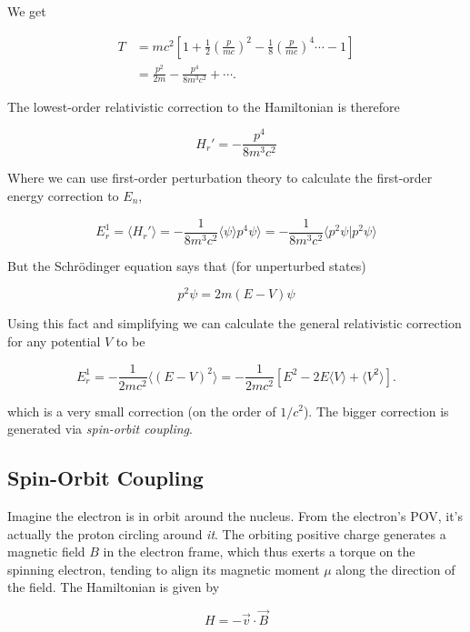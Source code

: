 \documentclass[svgnames]{article}
\begin{document}
We get 

\begin{align*}
    T &= mc^2\left[ 1 + \frac{1}{2}\left( \frac{p}{mc}  \right) ^2 - \frac{1}{8} \left( \frac{p}{mc} \right) ^4 \cdots - 1 \right]\\
      &= \frac{p^2}{2m} - \frac{p^4}{8m^3c^2} + \cdots.
\end{align*} \vspace{3px}


The lowest-order relativistic correction to the Hamiltonian is therefore 

\[
H_r' = -\frac{p^4}{8m^3 c^2}
\] \vspace{3px}

Where we can use first-order perturbation theory to calculate the first-order energy correction to $E_n$, 

\[
E_r^{1} = \langle H_r' \rangle = -\frac{1}{8m^3c^2}\langle \psi \rangle p^4 \psi \rangle = -\frac{1}{8m^3c^2}\langle p^2 \psi | p^2 \psi \rangle 
\] \vspace{3px}

But the Schr\"odinger equation says that (for unperturbed states) 

\[
p^2\psi = 2m(E-V)\psi
\] \vspace{3px}

Using this fact and simplifying we can calculate the general relativistic correction for any potential $V$ to be 

\[
    \boxed{
    E_r^{1} = -\frac{1}{2mc^2} \Big\langle (E-V)^2 \Big\rangle = -\frac{1}{2mc^2} \left[ E^2 - 2E\langle V\rangle + \langle V^2 \rangle \right].
}\] \vspace{3px}

which is a very small correction (on the order of $1/c^2$). The bigger correction is generated via  \textit{spin-orbit coupling}. 

\subsection{Spin-Orbit Coupling} 

Imagine the electron is in orbit around the nucleus. From the electron's POV, it's actually the proton circling around \textit{it}. 
The orbiting positive charge generates a magnetic field $B$ in the electron frame, which thus exerts a torque 
on the spinning electron, tending to align its magnetic moment $\mu$ along the direction of the field. 
The Hamiltonian is given by 

\[
H = -\vec{v} \cdot \vec{B}
\] \vspace{3px}
\end{document}
